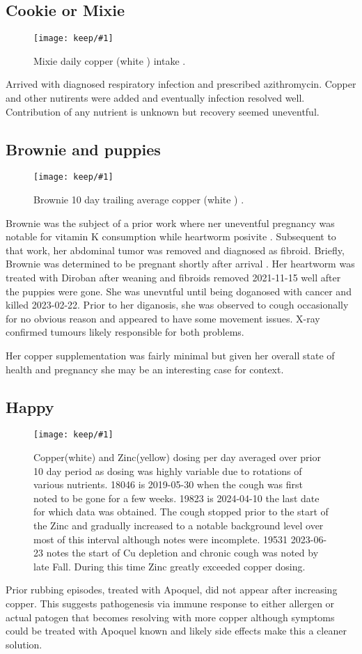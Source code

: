\documentclass[aps,secnumarabic,balancelastpage,amsmath,amssymb,nofootinbib]{revtex4}
\newlength{\fullfigwidth}  \setlength{\fullfigwidth}{.8\textwidth }
\newcommand{\mjmfullplot}[1]{\texttt{[image: keep/\#1]}}
\newcommand{\mjmhappycu}{
\begin{figure}[htb] 
\centering
\mjmfullplot{happy2seeyou.jpg}
\caption{  Copper(white) and Zinc(yellow) dosing per day averaged over 
prior 10 day period as dosing was highly variable due to rotations
of various nutrients. 
18046 is 2019-05-30 when the cough was first noted to be gone for a few weeks. 19823 is  2024-04-10 the last date for which data was obtained. The cough stopped prior to the start of the Zinc and gradually increased to a notable background level over most of this interval although notes were incomplete. 
19531 2023-06-23 notes the start of Cu depletion and chronic cough was noted by late Fall. During this time Zinc greatly exceeded copper dosing.  }
\end{figure}
} %
\newcommand{\mjmmixiecu}{
\begin{figure}[htb] 
\centering
\mjmfullplot{mixie_cu.jpg}
\caption{    Mixie daily copper (white ) intake 
. 
  }
\end{figure}
} %
\newcommand{\mjmbrowniecu}{
\begin{figure}[htb] 
\centering
\mjmfullplot{brownie_cu.jpg}
\caption{    Brownie 10 day trailing average copper (white )
. 
  }
\end{figure}
} %
\begin{document}
\subsection{Cookie or Mixie}

\mjmmixiecu

Arrived with diagnosed respiratory infection and prescribed azithromycin.
Copper and other nutirents were added and eventually infection
resolved well. Contribution of any nutrient is unknown but recovery
seemed uneventful.

\subsection{Brownie and puppies}

\mjmbrowniecu

Brownie was the subject of a prior work 
where ner uneventful pregnancy was notable
for vitamin K consumption while heartworm posivite
\cite{mmarchywka-MJM-2021-003-v0.50rg}. 
Subsequent to that work, her abdominal tumor
was removed and diagnosed as fibroid. 
Briefly, 
Brownie was determined to be pregnant shortly after arrival
. Her  heartworm
was  treated with Diroban after weaning  and fibroids
removed 2021-11-15 well after the puppies were gone. She was
unevntful until being doganosed with cancer and killed
2023-02-22. Prior to her diganosis, she was observed to 
cough occasionally for no obvious reason and appeared to
have some movement issues. X-ray confirmed tumours likely
responsible for both problems.   

Her copper supplementation was fairly minimal but given her
overall state of health and pregnancy she may be
an interesting case for context. 


\subsection{Happy}

\mjmhappycu
Prior rubbing episodes, treated with Apoquel, did not appear
after increasing copper. This suggests pathogenesis via 
immune response to either allergen or actual patogen 
that becomes resolving with more copper although symptoms
could be treated with Apoquel known and likely side effects
make this a cleaner solution. 
\end{document}
